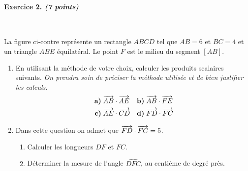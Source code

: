 \documentclass[11pt]{article}
\begin{document}
\paragraph{Exercice 2. \emph{(7 points)}}~\\
\begin{minipage}{.6\textwidth}
  La figure ci-contre représente un rectangle $ABCD$ tel que $AB=6$ et $BC=4$ et
  un triangle $ABE$ équilatéral. Le point $F$ est le milieu du segment $\left[
  AB \right]$.
  \begin{enumerate}
    \item En utilisant la méthode de votre choix, calculer les produits
      scalaires suivants. \emph{On prendra soin de préciser la méthode utilisée
      et de bien justifier les calculs.}
      \begin{align*}
        \textbf{a)}\;& \overrightarrow{AB}\cdot\overrightarrow{AE} &
        \textbf{b)}\;& \overrightarrow{AB}\cdot\overrightarrow{FE} \\
        \textbf{c)}\;& \overrightarrow{AE}\cdot\overrightarrow{CD} &
        \textbf{d)}\;& \overrightarrow{FD}\cdot\overrightarrow{FC}
      \end{align*}
    \item Dans cette question on admet que $\overrightarrow{FD}\cdot\overrightarrow{FC}=5$.
      \begin{enumerate}
        \item Calculer les longueurs $DF$ et $FC$.
        \item Déterminer la mesure de l'angle $\widehat{DFC}$, au centième de
          degré près.
      \end{enumerate}
  \end{enumerate}
\end{minipage}
\begin{minipage}{.4\textwidth}
\begin{center}
\end{center}
\end{minipage}
\end{document}
